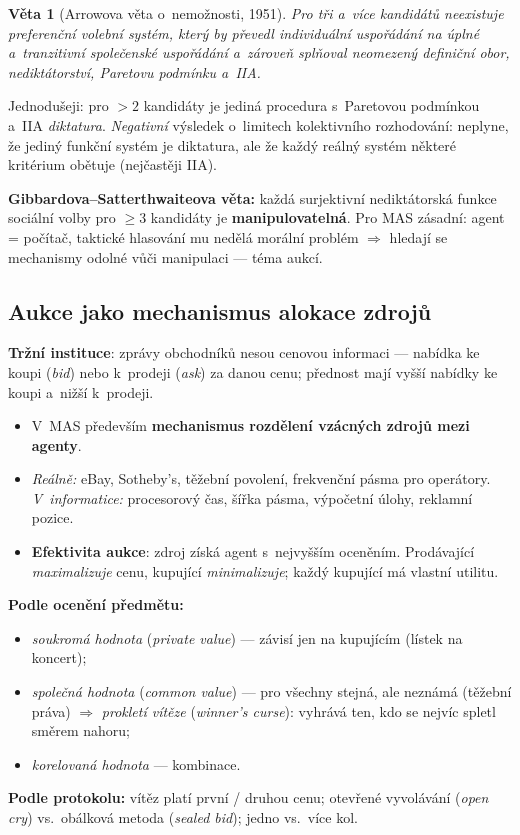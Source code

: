 \documentclass[11pt,a4paper]{article}
\newtheorem{veta}{Věta}[section]
\theoremstyle{definition}
\begin{document}
\begin{veta}[Arrowova věta o~nemožnosti, 1951]
Pro tři a~více kandidátů neexistuje preferenční volební systém, který by převedl individuální
uspořádání na úplné a~tranzitivní společenské uspořádání a~zároveň splňoval neomezený definiční
obor, nediktátorství, Paretovu podmínku a~IIA.
\end{veta}

Jednodušeji: pro $>2$ kandidáty je jediná procedura s~Paretovou podmínkou a~IIA
\emph{diktatura}. \emph{Negativní} výsledek o~limitech kolektivního rozhodování: neplyne, že
jediný funkční systém je diktatura, ale že každý reálný systém některé kritérium obětuje
(nejčastěji IIA).

\textbf{Gibbardova--Satterthwaiteova věta:} každá surjektivní nediktátorská funkce sociální
volby pro $\ge 3$ kandidáty je \textbf{manipulovatelná}. Pro MAS zásadní: agent = počítač,
taktické hlasování mu nedělá morální problém $\Rightarrow$ hledají se mechanismy odolné vůči
manipulaci --- téma aukcí.
\subsection{Aukce jako mechanismus alokace zdrojů}
\label{ssec:aukce}

\begin{defbox}[Aukce]
\textbf{Tržní instituce}: zprávy obchodníků nesou cenovou informaci --- nabídka ke koupi
(\emph{bid}) nebo k~prodeji (\emph{ask}) za danou cenu; přednost mají vyšší nabídky ke koupi
a~nižší k~prodeji.
\begin{itemize}
\item V~MAS především \textbf{mechanismus rozdělení vzácných zdrojů mezi agenty}.
\item \emph{Reálně:} eBay, Sotheby's, těžební povolení, frekvenční pásma pro operátory.
  \emph{V~informatice:} procesorový čas, šířka pásma, výpočetní úlohy, reklamní pozice.
\item \textbf{Efektivita aukce}: zdroj získá agent s~nejvyšším oceněním. Prodávající
  \emph{maximalizuje} cenu, kupující \emph{minimalizuje}; každý kupující má vlastní utilitu.
\end{itemize}
\end{defbox}

\begin{defbox}
\textbf{Podle ocenění předmětu:}
\begin{itemize}
\item \emph{soukromá hodnota} (\emph{private value}) --- závisí jen na kupujícím (lístek na
  koncert);
\item \emph{společná hodnota} (\emph{common value}) --- pro všechny stejná, ale neznámá (těžební
  práva) $\Rightarrow$ \emph{prokletí vítěze} (\emph{winner's curse}): vyhrává ten, kdo se
  nejvíc spletl směrem nahoru;
\item \emph{korelovaná hodnota} --- kombinace.
\end{itemize}
\textbf{Podle protokolu:} vítěz platí první / druhou cenu; otevřené vyvolávání (\emph{open cry})
vs.\ obálková metoda (\emph{sealed bid}); jedno vs.\ více kol.
\end{defbox}
\end{document}
